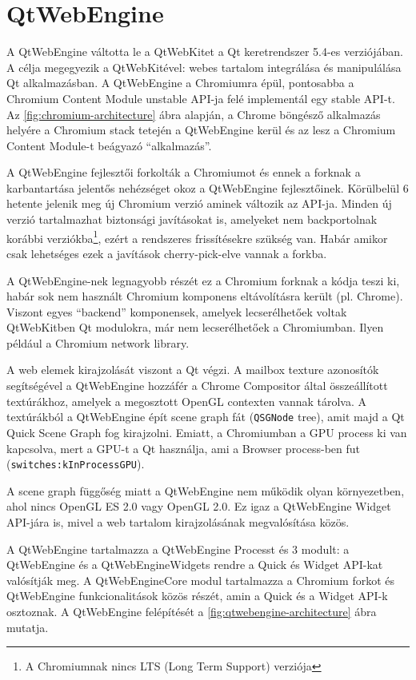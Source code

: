 \documentclass[12pt]{report}
\begin{document}
\section{QtWebEngine}
A QtWebEngine váltotta le a QtWebKitet a Qt keretrendszer 5.4-es verziójában. A célja
megegyezik a QtWebKitével: webes tartalom integrálása és manipulálása Qt alkalmazásban.
A QtWebEngine a Chromiumra épül, pontosabba a Chromium Content Module unstable API-ja
felé implementál egy stable API-t. Az \ref{fig:chromium-architecture} ábra alapján,
a Chrome böngésző alkalmazás helyére a Chromium stack tetején a QtWebEngine kerül és
az lesz a Chromium Content Module-t beágyazó ``alkalmazás''.

A QtWebEngine fejlesztői forkolták a Chromiumot és ennek a forknak a karbantartása jelentős
nehézséget okoz a QtWebEngine fejlesztőinek. Körülbelül 6 hetente jelenik meg új Chromium
verzió aminek változik az API-ja. Minden új verzió tartalmazhat biztonsági javításokat is,
amelyeket nem backportolnak korábbi verziókba\footnote{A Chromiumnak nincs LTS (Long Term
Support) verziója}, ezért a rendszeres frissítésekre szükség van. Habár amikor csak
lehetséges ezek a javítások cherry-pick-elve vannak a forkba.

A QtWebEngine-nek legnagyobb részét ez a Chromium forknak a kódja teszi ki, habár sok
nem használt Chromium komponens eltávolításra került (pl. Chrome). Viszont egyes
``backend'' komponensek, amelyek lecserélhetőek voltak QtWebKitben Qt modulokra, már
nem lecserélhetőek a Chromiumban. Ilyen például a Chromium network library.

A web elemek kirajzolását viszont a Qt végzi. A mailbox texture azonosítók segítségével a
QtWebEngine hozzáfér a Chrome Compositor által összeállított textúrákhoz, amelyek a
megosztott OpenGL contexten vannak tárolva.
A textúrákból a QtWebEngine épít scene graph fát (\texttt{QSGNode} tree), amit majd a
Qt Quick Scene Graph fog kirajzolni. Emiatt, a Chromiumban a GPU process ki van kapcsolva,
mert a GPU-t a Qt használja, ami a Browser process-ben fut (\texttt{switches:kInProcessGPU}).

A scene graph függőség miatt a QtWebEngine nem működik olyan környezetben, ahol nincs
OpenGL ES 2.0 vagy OpenGL 2.0. Ez igaz a QtWebEngine Widget API-jára is, mivel a web tartalom
kirajzolásának megvalósítása közös.

A QtWebEngine tartalmazza a QtWebEngine Processt és 3 modult: a QtWebEngine és a
QtWebEngineWidgets rendre a Quick és Widget API-kat valósítják meg. A QtWebEngineCore
modul tartalmazza a Chromium forkot és QtWebEngine funkcionalitások közös részét, amin a
Quick és a Widget API-k osztoznak. A QtWebEngine felépítését a
\ref{fig:qtwebengine-architecture} ábra mutatja.
\end{document}
